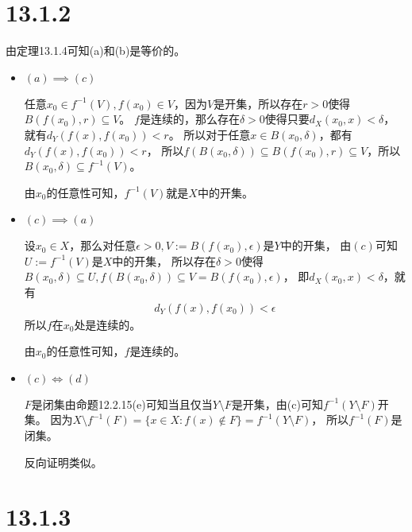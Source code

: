 \documentclass{article}
\begin{document}
\section*{13.1.2}

由定理13.1.4可知(a)和(b)是等价的。

\begin{itemize}
  \item $(a) \implies (c)$

        任意$x_0 \in f^{-1}(V), f(x_0) \in V$，因为$V$是开集，所以存在$r > 0$使得$B(f(x_0), r) \subseteq V$。
        $f$是连续的，那么存在$\delta > 0$使得只要$d_X(x_0, x) < \delta$，就有$d_Y(f(x), f(x_0)) < r$。
        所以对于任意$x \in B(x_0, \delta)$，都有$d_Y(f(x), f(x_0)) < r$，
        所以$f(B(x_0, \delta)) \subseteq B(f(x_0), r) \subseteq V$，所以$B(x_0, \delta) \subseteq f^{-1}(V)$。

        由$x_0$的任意性可知，$f^{-1}(V)$就是$X$中的开集。

  \item $(c) \implies (a)$

        设$x_0 \in X$，那么对任意$\epsilon > 0, V := B(f(x_0), \epsilon)$是$Y$中的开集，
        由$(c)$可知$U := f^{-1}(V)$是$X$中的开集，
        所以存在$\delta > 0$使得$B(x_0, \delta) \subseteq U, f(B(x_0, \delta)) \subseteq V = B(f(x_0), \epsilon)$，
        即$d_X(x_0, x) < \delta$，就有
        \begin{align*}
          d_Y(f(x), f(x_0)) < \epsilon
        \end{align*}
        所以$f$在$x_0$处是连续的。

        由$x_0$的任意性可知，$f$是连续的。

  \item $(c) \Leftrightarrow (d)$

        $F$是闭集由命题12.2.15(e)可知当且仅当$Y \setminus F$是开集，由(c)可知$f^{-1}(Y \setminus F)$开集。
        因为$X \setminus f^{-1}(F) = \{x \in X : f(x) \not\in F\} = f^{-1}(Y \setminus F)$，
        所以$f^{-1}(F)$是闭集。

        反向证明类似。
\end{itemize}

\section*{13.1.3}
\end{document}

